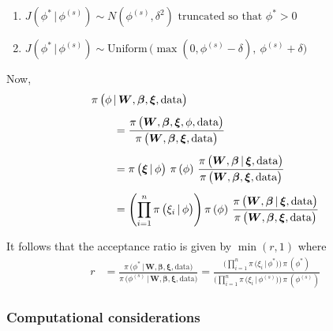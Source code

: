 \documentclass[11pt]{article}
\renewcommand{\vec}{\boldsymbol}
\newcommand{\barS}{\,|\,}
\begin{document}
\begin{enumerate}[label=Step \arabic*., leftmargin=13mm, itemsep=10mm]
\begin{enumerate}[label=(\roman*), itemsep=3mm]
\item $ J\left( \phi^* \barS \phi^{(s)} \right) \sim N\left( \phi^{(s)}, \delta^2 \right) \text{ truncated so that $\phi^* > 0$} $
\item $ J\left( \phi^* \barS \phi^{(s)} \right) \sim \text{Uniform}\, \Big( \max\left(0, \phi^{(s)} - \delta\right),~ \phi^{(s)} + \delta \Big) $
\end{enumerate} \vspace{6mm}

Now,
\begin{align*} \MoveEqLeft
\pi\, \big( \phi \barS \vec{W}, \vec{\beta}, \vec{\xi}, \text{data} \big) \\[1ex]
&= \frac{ \pi\,\big( \vec{W}, \vec{\beta}, \vec{\xi}, \phi, \text{data} \big) }{ \pi\,\big( \vec{W}, \vec{\beta}, \vec{\xi}, \text{data} \big) } \\[1ex]
&= \pi\,\big( \vec{\xi} \barS \phi \big)~ \pi\,(\phi)~ \frac{ \pi\,\big( \vec{W}, \vec{\beta} \barS \vec{\xi}, \text{data} \big) }{ \pi\,\big( \vec{W}, \vec{\beta}, \vec{\xi}, \text{data} \big) } \\[1ex]
&= \left( \prod_{i=1}^n \pi\,\big( \xi_i \barS \phi \big) \right) \pi\,(\phi)~ \frac{ \pi\,\big( \vec{W}, \vec{\beta} \barS \vec{\xi}, \text{data} \big) }{ \pi\,\big( \vec{W}, \vec{\beta}, \vec{\xi}, \text{data} \big) }
\end{align*}


It follows that the acceptance ratio is given by $\min(r,1)$ where
\begin{align*}
r &= \frac{ \pi\, \big( \phi^* \barS \vec{W}, \vec{\beta}, \vec{\xi}, \text{data} \big) }{ \pi\, \big( \phi^{(s)} \barS \vec{W}, \vec{\beta}, \vec{\xi}, \text{data} \big) } = \frac{ \bigg( \prod_{i=1}^n \pi\,\big( \xi_i \barS \phi^* \big) \bigg)\, \pi\,(\phi^*) }{ \bigg( \prod_{i=1}^n \pi\,\big( \xi_i \barS \phi^{(s)} \big) \bigg)\, \pi\,(\phi^{(s)}) }
\end{align*}

\end{enumerate}





\subsubsection{Computational considerations}
\end{document}
